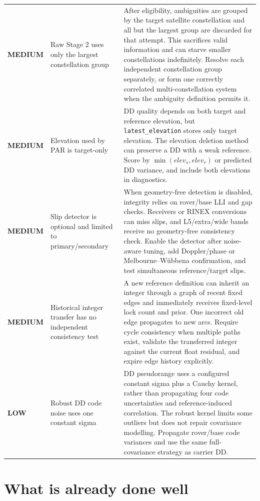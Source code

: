 \documentclass[11pt,a4paper]{article}
\newcommand{\code}[1]{\texttt{#1}}
\newcommand{\medium}{\textcolor{orange!85!black}{\textbf{MEDIUM}}}
\newcommand{\low}{\textcolor{green!45!black}{\textbf{LOW}}}
\begin{document}
\begin{longtable}{>{\raggedright\arraybackslash}p{18mm}p{43mm}p{93mm}}
\medium & Raw Stage 2 uses only the largest constellation group &
After eligibility, ambiguities are grouped by the target satellite constellation
and all but the largest group are discarded for that attempt.  This sacrifices
valid information and can starve smaller constellations indefinitely.  Resolve
each independent constellation group separately, or form one correctly
correlated multi-constellation system when the ambiguity definition permits it. \\
\addlinespace

\medium & Elevation used by PAR is target-only &
DD quality depends on both target and reference elevation, but
\code{latest\_elevation} stores only target elevation.  The elevation deletion
method can preserve a DD with a weak reference.  Score by
$\min(elev_s,elev_r)$ or predicted DD variance, and include both elevations in
diagnostics. \\
\addlinespace

\medium & Slip detector is optional and limited to primary/secondary &
When geometry-free detection is disabled, integrity relies on rover/base LLI
and gap checks.  Receivers or RINEX conversions can miss slips, and L5/extra/wide
bands receive no geometry-free consistency check.  Enable the detector after
noise-aware tuning, add Doppler/phase or Melbourne--W\"ubbena confirmation, and
test simultaneous reference/target slips. \\
\addlinespace

\medium & Historical integer transfer has no independent consistency test &
A new reference definition can inherit an integer through a graph of recent
fixed edges and immediately receives fixed-level lock count and prior.  One
incorrect old edge propagates to new arcs.  Require cycle consistency when
multiple paths exist, validate the transferred integer against the current
float residual, and expire edge history explicitly. \\
\addlinespace

\low & Robust DD code noise uses one constant sigma &
DD pseudorange uses a configured constant sigma plus a Cauchy kernel, rather
than propagating four code uncertainties and reference-induced correlation.
The robust kernel limits some outliers but does not repair covariance modelling.
Propagate rover/base code variances and use the same full-covariance strategy as
carrier DD. \\
\bottomrule
\end{longtable}

\section{What is already done well}
\end{document}
